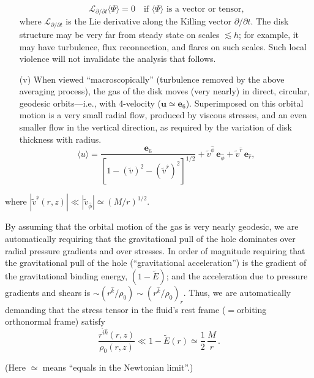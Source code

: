 \begin{enumerate}
\begin{equation}
\tag{5.5.3}
\end{equation}
\begin{equation}
\mathscr{L}_{\partial/\partial t}\langle \Psi \rangle = 0 \quad \text{if } \langle \Psi \rangle \text{ is a vector or tensor,}
\tag{5.5.3}
\end{equation}
where $\mathscr{L}_{\partial/\partial t}$ is the Lie derivative along the Killing vector $\partial/\partial t$.  The
disk structure may be very far from steady state on scales $\lesssim h$; for
example, it may have turbulence, flux reconnection, and flares on such
scales.  Such local violence will not invalidate the analysis that follows.
\item[(v)] When viewed ``macroscopically'' (turbulence removed by the above
averaging process), the gas of the disk moves (very nearly) in direct,
circular, geodesic orbits---i.e., with 4-velocity ($\mathbf{u} \simeq \mathbf{e}_6$). Superimposed
on this orbital motion is a very small radial flow, produced by viscous
stresses, and an even smaller flow in the vertical direction, as required
by the variation of disk thickness with radius.
\begin{equation}
\langle u \rangle = \frac{\mathbf{e}_6}{[1 - (\tilde{v})^2 - (\tilde{v}^{\hat{r}})^2]^{1/2}}
+ \tilde{v}^{\hat{\phi}}\,\mathbf{e}_{\hat{\phi}}
+ \tilde{v}^{\hat{r}}\,\mathbf{e}_{\hat{r}},
\tag{5.5.4}
\end{equation}
\end{enumerate}

\noindent
where $|\tilde{v}^{\hat{r}}(r,z)| \ll |\tilde{v}_{\hat{\phi}}| \simeq (M/r)^{1/2}$.

By assuming that the orbital motion of the gas is very nearly geodesic,
we are automatically requiring that the gravitational pull of the hole
dominates over radial pressure gradients and over stresses.  In
order of magnitude requiring that the gravitational pull of the hole (``gravitational
acceleration'') is the gradient of the gravitational binding energy,
$(1-\tilde{E})$; and the acceleration due to pressure gradients and shears is
$\sim (r^{\hat{k}}/\rho_0) \sim (r^{\hat{k}}\!/\rho_0)_r$.  Thus, we are automatically demanding that the
stress tensor in the fluid's rest frame (${}={}$orbiting orthonormal frame)
satisfy
\begin{equation}
\frac{r^{\hat{i}\hat{k}}(r,z)}{\rho_0(r,z)} \ll 1 - \tilde{E}(r) \simeq \frac{1}{2}\,\frac{M}{r}\,.
\tag{5.5.6}
\end{equation}

(Here $\simeq$ means ``equals in the Newtonian limit''.)


